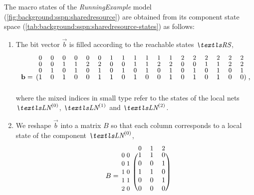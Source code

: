 \begin{runningExample}
  The macro states of the \emph{RunningExample}  model
  (\vref{fig:background:sspn:sharedresource}) are obtained from its
  component state space
  (\vref{tab:background:sspn:sharedresource-states}) as follows:
  \begin{enumerate}
  \item The bit vector $\vec{b}$ is filled according to the reachable
    states $\RS$,
    \begin{equation}
      \begin{blockarray}{r@{\mkern15mu}*{18}{>{$\bgroup\small$}c<{$\egroup$}}@{\mkern12mu}l}
        & 0 & 0 & 0 & 0 & 0 & 0 & 1 & 1 & 1 & 1 & 1 & 1 & 2 & 2 & 2 &
        2 & 2 & 2 & \\[-0.7ex]
        & 0 & 0 & 1 & 1 & 2 & 2 & 0 & 0 & 1 & 1 & 2 & 2 & 0 & 0 & 1 &
        1 & 2 & 2 & \\[-0.7ex]
        & 0 & 1 & 0 & 1 & 0 & 1 & 0 & 1 & 0 & 1 & 0 & 1 & 0 & 1 & 0 &
        1 & 0 & 1 & \\[-0.5ex]
        \begin{block}{r@{\mkern15mu}(*{18}{c})@{\mkern12mu}l}
          \vec{b} = & 1 & 0 & 1 & 0 & 0 & 1 & 1 & 0 & 1 & 0 & 0 & 1 &
          0 & 1 & 0 & 1 & 0 & 0 & \text, \\
        \end{block}
      \end{blockarray}
    \end{equation}
    where the mixed indices in small type refer to the states of the
    local nets $\LN{0}$, $\LN{1}$ and $\LN{2}$.
  \item We reshape $\vec{b}$ into a matrix $B$ so that each column
    corresponds to a local state of the component $\LN{0}$,
    \begin{equation}
      \begin{blockarray}{r*{2}{@{\mkern5mu}>{$\bgroup\small$}c<{$\egroup$}}*{3}{>{$\bgroup\small$}c<{$\egroup$}}}
        & & & 0 & 1 & 2 \\[-0.5ex]
        \begin{block}{r*{2}{@{\mkern5mu}>{$\bgroup\small$}c<{$\egroup$}}(*{3}{c})}
          \multirow{6}{*}{$B =\,$} & 0 & 0 & 1 & 1 & 0 \\
          & 0 & 1 & 0 & 0 & 1 \\
          & 1 & 0 & 1 & 1 & 0 \\
          & 1 & 1 & 0 & 0 & 1 \\
          & 2 & 0 & 0 & 0 & 0 \\

\end{block}
\end{blockarray}
\end{equation}
\end{enumerate}
\end{runningExample}
